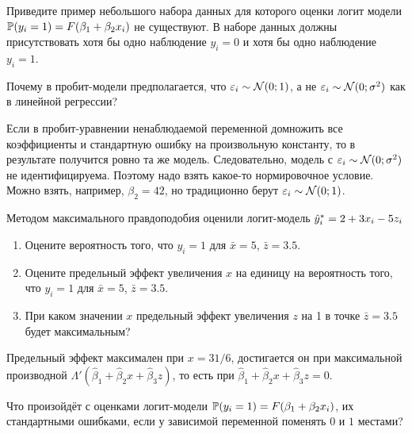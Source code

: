 \begin{problem}
Приведите пример небольшого набора данных для которого оценки логит модели $\P(y_i=1)=F(\beta_1 + \beta_2 x_i)$ не существуют. В наборе данных должны присутствовать хотя бы одно наблюдение $y_i=0$ и хотя бы одно наблюдение $y_i=1$.
\begin{sol}
\end{sol}
\end{problem}

\begin{problem}
Почему в пробит-модели предполагается, что $\e_i \sim \cN(0;1)$, а не $\e_i \sim \cN(0;\sigma^2)$ как в линейной регрессии?
\begin{sol}
Если в пробит-уравнении ненаблюдаемой переменной домножить все коэффициенты и стандартную ошибку на произвольную константу, то в результате получится ровно та же модель. Следовательно, модель с $\e_i \sim \cN(0;\sigma^2)$ не идентифицируема. Поэтому надо взять какое-то нормировочное условие. Можно взять, например, $\beta_2 = 42$, но традиционно берут $\e_i \sim \cN(0;1)$.
\end{sol}
\end{problem}


\begin{problem}
Методом максимального правдоподобия оценили логит-модель $\hy^*_i=2+3x_i - 5z_i$
\begin{enumerate}
\item Оцените вероятность того, что $y_i=1$ для $\bar{x}=5$, $\bar{z}=3.5$.
\item Оцените предельный эффект увеличения $x$ на единицу на вероятность того, что $y_i=1$ для $\bar{x}=5$, $\bar{z}=3.5$.
\item При каком значении $x$ предельный эффект увеличения $z$ на 1 в точке $\bar{z}=3.5$ будет максимальным?
\end{enumerate}

\begin{sol}
Предельный эффект максимален при $x=31/6$, достигается он при максимальной производной $\Lambda'(\hat \beta_1 + \hat\beta_2x + \hat\beta_3z)$, то есть при $\hat \beta_1 + \hat\beta_2x + \hat\beta_3z=0$.
\end{sol}
\end{problem}



\begin{problem}
Что произойдёт с оценками логит-модели $\P(y_i=1)=F(\beta_1 + \beta_2 x_i)$, их стандартными ошибками, если у зависимой переменной поменять $0$ и $1$ местами?
\begin{sol}
\end{sol}
\end{problem}




